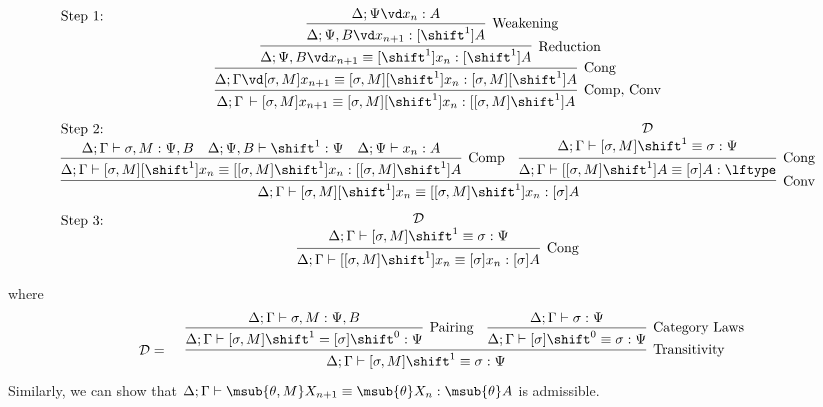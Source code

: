 \documentclass[copyright,creativecommons]{eptcs}
\newcommand{\der}{\,\vdash}
\newcommand{\shiftby}[1]{\shift^{#1}}
\newcommand{\esub}[1]{[#1]}
\begin{document}
\[
\begin{array}{c}
\multicolumn{1}{l}{\mbox{Step 1:\hspace{14cm}}}\\[-1.25em]
\infer[\text{Comp, Conv}]
 {\Delta ; \Gamma \der  [\sigma,M]x_{n+1} \equiv 
                        [\sigma,M][\shift^1]x_n : [[\sigma,M]\shiftby 1]A}
 {\infer[\text{Cong}]
   {\Delta ; \Gamma \vd [\sigma,M]x_{n+1} \equiv 
                        [\sigma,M][\shift^1]x_n : [\sigma,M][\shiftby 1]A}
   {\infer[\text{Reduction}]
      {\Delta ; \Psi,B \vd x_{n+1} \equiv [\shift^1]x_n : [\shiftby 1]A}
      {\infer[\text{Weakening}]
         {\Delta ; \Psi,B \vd x_{n+1} : \esub{\shiftby 1}A}
{\Delta ; \Psi \vd x_{n} : A}
}
   }
 }
\\[0.75em] 
\multicolumn{1}{l}{\mbox{Step 2:}}\\[-1.25em]
\infer[\text{Conv}]{\Delta ; \Gamma \vdash  [\sigma, M][\shift^1]x_n \equiv  [[\sigma,M]\shift^1]x_n : [\sigma]A}{
\infer[\text{Comp}]{\Delta ; \Gamma \vdash  [\sigma, M][\shift^1]x_n \equiv  [[\sigma,M]\shift^1]x_n : [[\sigma,M]\shift^1]A}{
\Delta ; \Gamma \vdash \sigma,M : \Psi,B & 
\Delta ; \Psi,B \vdash \shift^1 : \Psi & \Delta ; \Psi \vdash x_n : A
  }
& 
\infer[\text{Cong}]{\Delta ; \Gamma \vdash [[\sigma,M]\shift^1]A \equiv [\sigma]A : \lftype}{
  \begin{array}[h]{c}
    \cal{D} \\ 
    \Delta ; \Gamma \vdash [\sigma,M]\shift^1 \equiv \sigma : \Psi
  \end{array}
}
}
\\[0.85em]
\multicolumn{1}{l}{\mbox{Step 3:}}\\[-1.35em]
\infer[\text{Cong}]{\Delta ; \Gamma \vdash [[\sigma, M]\shift^1]x_n \equiv  [\sigma]x_n : [\sigma]A}{
  \begin{array}[h]{c}
\cal{D} \\
\Delta ; \Gamma \vdash [\sigma, M]\shift^1 \equiv \sigma :   \Psi     
  \end{array}
  } 
\end{array}
\]

where  
\vspace{-0.65cm}
\[
\begin{array}[b]{cc}
  \begin{array}[h]{c}
\\[-2.75em]
\cal{D} =    
  \end{array}
 &
\infer[\text{Transitivity}]{\Delta ; \Gamma \vdash [\sigma,M]\shift^1 \equiv \sigma :\Psi}{
  \infer[\text{Pairing}]{\Delta ; \Gamma \vdash [\sigma,M]\shift^1 = [\sigma]\shift^0 : \Psi}{
          \Delta ; \Gamma \vdash \sigma , M : \Psi,B} 
 & 
  \infer[\text{Category Laws}]{\Delta ; \Gamma \vdash [\sigma]\shift^0 \equiv \sigma : \Psi}{
         \Delta ; \Gamma \vdash \sigma : \Psi}
}  
\end{array}
\]
Similarly, we can show that $\Delta ; \Gamma \vdash \msub{\theta, M} X_{n+1} \equiv \msub{\theta}X_n : \msub{\theta}A$ is admissible.
\end{document}
